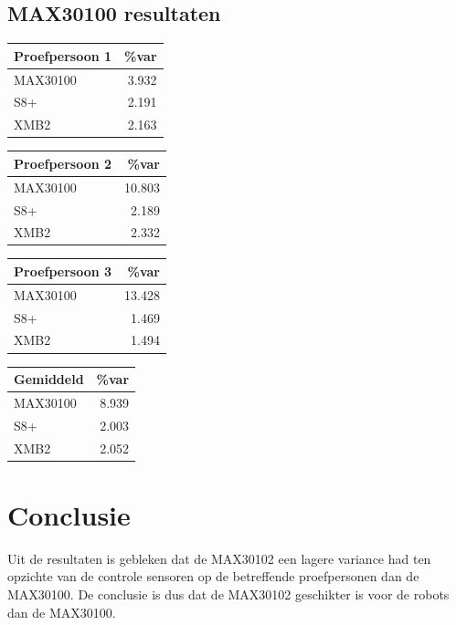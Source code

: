 \documentclass[11pt]{article}
\begin{document}
\subsection{MAX30100 resultaten}\label{subsec:max30100 resultaten}

	\begin{table}[H]
	\begin{tabular}{l|r}
\textbf{Proefpersoon 1}  & \%var  \\
	\hline
	MAX30100	& 3.932  \\
	S8+		& 2.191  \\
	XMB2		& 2.163  \\
	\end{tabular}
	\end{table}


	\begin{table}[H]
	\begin{tabular}{l|r}
\textbf{Proefpersoon 2}  & \%var  \\
	\hline
	MAX30100	& 10.803  \\
	S8+		& 2.189  \\
	XMB2		& 2.332  \\
	\end{tabular}
	\end{table}



	\begin{table}[H]
	\begin{tabular}{l|r}
\textbf{Proefpersoon 3}  & \%var  \\
	\hline
	MAX30100	& 13.428  \\
	S8+		& 1.469  \\
	XMB2		& 1.494  \\
	\end{tabular}
	\end{table}


	\begin{table}[H]
	\begin{tabular}{l|r}
		\textbf{Gemiddeld}\hspace{0.8cm}  & \%var  \\
	\hline
	MAX30100	& 8.939  \\
	S8+		& 2.003  \\
	XMB2		& 2.052  \\
	\end{tabular}
	\end{table}


    \section{Conclusie}\label{sec:conclusie}
Uit de resultaten is gebleken dat de MAX30102 een lagere variance had ten opzichte van de controle sensoren op de betreffende proefpersonen dan de MAX30100. De conclusie is dus dat de MAX30102 geschikter is voor de robots dan de MAX30100.
\end{document}

